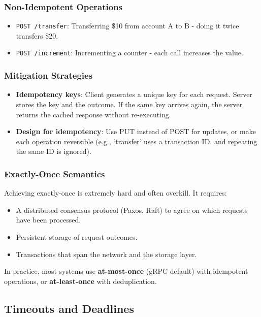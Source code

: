 \documentclass[10pt,a4paper]{article}
\begin{document}
\subsubsection{Non-Idempotent Operations}
\begin{itemize}
    \item \texttt{POST /transfer}: Transferring \$10 from account A to B - doing it twice transfers \$20.
    \item \texttt{POST /increment}: Incrementing a counter - each call increases the value.
\end{itemize}

\subsubsection{Mitigation Strategies}
\begin{itemize}
    \item \textbf{Idempotency keys}: Client generates a unique key for each request. Server stores the key and the outcome. If the same key arrives again, the server returns the cached response without re-executing.
    \item \textbf{Design for idempotency}: Use PUT instead of POST for updates, or make each operation reversible (e.g., `transfer` uses a transaction ID, and repeating the same ID is ignored).
\end{itemize}

\subsubsection{Exactly-Once Semantics}
Achieving exactly-once is extremely hard and often overkill. It requires:
\begin{itemize}
    \item A distributed consensus protocol (Paxos, Raft) to agree on which requests have been processed.
    \item Persistent storage of request outcomes.
    \item Transactions that span the network and the storage layer.
\end{itemize}
In practice, most systems use \textbf{at-most-once} (gRPC default) with idempotent operations, or \textbf{at-least-once} with deduplication.

\subsection{Timeouts and Deadlines}
\end{document}
